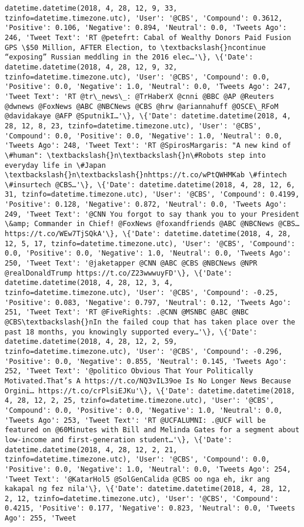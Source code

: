 \documentclass[11pt]{article}
\begin{document}
\begin{Verbatim}[commandchars=\\\{\}]
datetime.datetime(2018, 4, 28, 12, 9, 33, tzinfo=datetime.timezone.utc), 'User': '@CBS', 'Compound': 0.3612, 'Positive': 0.106, 'Negative': 0.894, 'Neutral': 0.0, 'Tweets Ago': 246, 'Tweet Text': 'RT @petefrt: Cabal of Wealthy Donors Paid Fusion GPS \$50 Million, AFTER Election, to \textbackslash{}ncontinue “exposing” Russian meddling in the 2016 elec…'\}, \{'Date': datetime.datetime(2018, 4, 28, 12, 9, 32, tzinfo=datetime.timezone.utc), 'User': '@CBS', 'Compound': 0.0, 'Positive': 0.0, 'Negative': 1.0, 'Neutral': 0.0, 'Tweets Ago': 247, 'Tweet Text': 'RT @tr\_news\_: @TrHaberX @cnni @BBC @AP @Reuters @dwnews @FoxNews @ABC @NBCNews @CBS @hrw @ariannahuff @OSCE\_RFoM @davidakaye @AFP @SputnikI…'\}, \{'Date': datetime.datetime(2018, 4, 28, 12, 8, 23, tzinfo=datetime.timezone.utc), 'User': '@CBS', 'Compound': 0.0, 'Positive': 0.0, 'Negative': 1.0, 'Neutral': 0.0, 'Tweets Ago': 248, 'Tweet Text': 'RT @SpirosMargaris: "A new kind of \#human": \textbackslash{}n\textbackslash{}n\#Robots step into everyday life in \#Japan \textbackslash{}n\textbackslash{}nhttps://t.co/wPtQWHMKab \#fintech \#insurtech @CBS…'\}, \{'Date': datetime.datetime(2018, 4, 28, 12, 6, 31, tzinfo=datetime.timezone.utc), 'User': '@CBS', 'Compound': 0.4199, 'Positive': 0.128, 'Negative': 0.872, 'Neutral': 0.0, 'Tweets Ago': 249, 'Tweet Text': '@CNN You forgot to say thank you to your President \&amp; Commander in Chief! @FoxNews @foxandfriends @ABC @NBCNews @CBS… https://t.co/WEw7TjSQkA'\}, \{'Date': datetime.datetime(2018, 4, 28, 12, 5, 17, tzinfo=datetime.timezone.utc), 'User': '@CBS', 'Compound': 0.0, 'Positive': 0.0, 'Negative': 1.0, 'Neutral': 0.0, 'Tweets Ago': 250, 'Tweet Text': '@jaketapper @CNN @ABC @CBS @NBCNews @NPR @realDonaldTrump https://t.co/Z23wwwuyFD'\}, \{'Date': datetime.datetime(2018, 4, 28, 12, 3, 4, tzinfo=datetime.timezone.utc), 'User': '@CBS', 'Compound': -0.25, 'Positive': 0.083, 'Negative': 0.797, 'Neutral': 0.12, 'Tweets Ago': 251, 'Tweet Text': 'RT @FiveRights: .@CNN @MSNBC @ABC @NBC @CBS\textbackslash{}nIn the failed coup that has taken place over the past 18 months, you knowingly supported every…'\}, \{'Date': datetime.datetime(2018, 4, 28, 12, 2, 59, tzinfo=datetime.timezone.utc), 'User': '@CBS', 'Compound': -0.296, 'Positive': 0.0, 'Negative': 0.855, 'Neutral': 0.145, 'Tweets Ago': 252, 'Tweet Text': '@politico Obvious That Your Politically Motivated.That’s A https://t.co/NQ3vIL39oe Is No Longer News Because Orgini… https://t.co/crPlsiEJKu'\}, \{'Date': datetime.datetime(2018, 4, 28, 12, 2, 25, tzinfo=datetime.timezone.utc), 'User': '@CBS', 'Compound': 0.0, 'Positive': 0.0, 'Negative': 1.0, 'Neutral': 0.0, 'Tweets Ago': 253, 'Tweet Text': 'RT @UCFALUMNI: .@UCF will be featured on @60Minutes with Bill and Melinda Gates for a segment about low-income and first-generation student…'\}, \{'Date': datetime.datetime(2018, 4, 28, 12, 2, 21, tzinfo=datetime.timezone.utc), 'User': '@CBS', 'Compound': 0.0, 'Positive': 0.0, 'Negative': 1.0, 'Neutral': 0.0, 'Tweets Ago': 254, 'Tweet Text': '@KatarHol5 @SolGenCalida @CBS oo nga eh, ikr ang kakapal ng fez nila'\}, \{'Date': datetime.datetime(2018, 4, 28, 12, 2, 12, tzinfo=datetime.timezone.utc), 'User': '@CBS', 'Compound': 0.4215, 'Positive': 0.177, 'Negative': 0.823, 'Neutral': 0.0, 'Tweets Ago': 255, 'Tweet 
\end{Verbatim}
\end{document}
